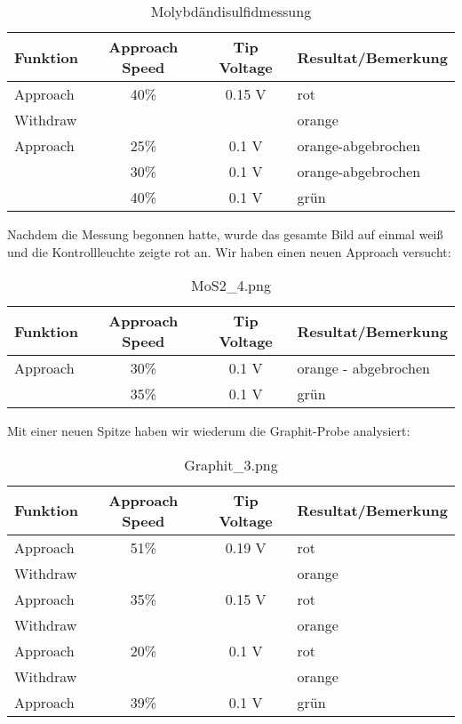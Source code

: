 \begin{table}[H]
\caption{Molybdändisulfidmessung}
\centering \begin{tabular}[H]{l c c l} 
Funktion & Approach Speed & Tip Voltage & Resultat/Bemerkung\\ \hline
Approach & 40\% & 0.15 V & rot\\
Withdraw & & & orange\\
Approach & 25\% & 0.1 V & orange-abgebrochen\\
 & 30\% & 0.1 V & orange-abgebrochen\\
 & 40\% & 0.1 V & grün\\
\end{tabular}
\end{table}

Nachdem die Messung begonnen hatte, wurde das gesamte Bild auf einmal weiß und die Kontrollleuchte zeigte rot an. Wir haben einen neuen Approach versucht:

\begin{table}[H]
\caption{MoS2\_4.png}
\centering \begin{tabular}[H]{l c c l}
Funktion & Approach Speed & Tip Voltage & Resultat/Bemerkung\\ \hline
Approach & 30\% & 0.1 V & orange - abgebrochen\\
 & 35\% & 0.1 V & grün
\end{tabular}
\end{table}


Mit einer neuen Spitze haben wir wiederum die Graphit-Probe analysiert:

\begin{table}[H]
\caption{Graphit\_3.png}
\centering \begin{tabular}[H]{l c c l}
Funktion & Approach Speed & Tip Voltage & Resultat/Bemerkung\\ \hline
Approach & 51\% & 0.19 V & rot\\
Withdraw & & & orange\\
Approach & 35\% & 0.15 V & rot\\
Withdraw & & & orange\\
Approach& 20\% & 0.1 V & rot\\
Withdraw & & & orange\\
Approach & 39\% & 0.1 V & grün\\
\end{tabular}
\end{table}

